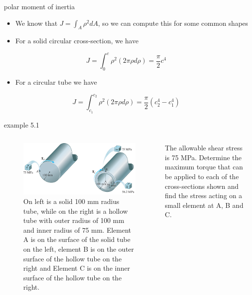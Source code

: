 \documentclass[
  letterpaper,
  ignorenonframetext,
  aspectratio=43,
  handout,
  12pt]{beamer}
\providecommand{\tightlist}{%
  \setlength{\itemsep}{0pt}\setlength{\parskip}{0pt}}
\providecommand{\tightlist}{%
\setlength{\itemsep}{0pt}\setlength{\parskip}{0pt}}
\let\Oldincludegraphics\includegraphics
\renewcommand{\includegraphics}[2][]{\Oldincludegraphics[width=\textwidth,height=0.7\textheight,keepaspectratio]{#2}}
\begin{document}
\begin{frame}{polar moment of inertia}
\protect\hypertarget{polar-moment-of-inertia}{}
\begin{itemize}
\tightlist
\item
  We know that \(J=\int_A \rho^2 dA\), so we can compute this for some
  common shapes
\item
  For a solid circular cross-section, we have
\end{itemize}

\[J = \int_0^c \rho^2 (2\pi \rho d\rho) = \frac{\pi}{2}c^4\]

\begin{itemize}
\tightlist
\item
  For a circular tube we have
\end{itemize}

\[J = \int_{c_1}^{c_2} \rho^2 (2\pi \rho d\rho) = \frac{\pi}{2}(c_2^4-c_1^4)\]
\end{frame}

\begin{frame}{example 5.1}
\protect\hypertarget{example-5.1}{}
\begin{columns}[T]
\begin{column}{0.5\textwidth}
\begin{figure}
\centering
\includegraphics{../images/example-5-1.png}
\caption{On left is a solid 100 mm radius tube, while on the right is a
hollow tube with outer radius of 100 mm and inner radius of 75 mm.
Element A is on the surface of the solid tube on the left, element B is
on the outer surface of the hollow tube on the right and Element C is on
the inner surface of the hollow tube on the right.}
\end{figure}
\end{column}

\begin{column}{0.5\textwidth}
The allowable shear stress is 75 MPa. Determine the maximum torque that
can be applied to each of the cross-sections shown and find the stress
acting on a small element at A, B and C.
\end{column}
\end{columns}
\end{frame}
\end{document}

